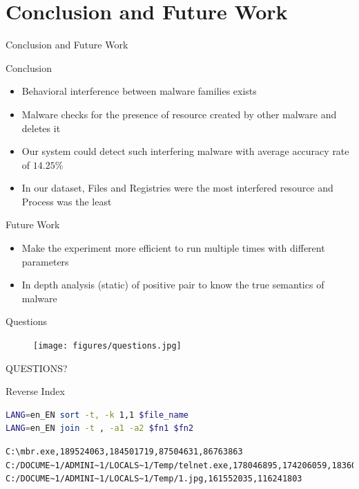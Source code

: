 \documentclass{beamer}
\begin{document}
\section{Conclusion and Future Work}
\begin{frame}{Conclusion and Future Work}
  \begin{block}{Conclusion}
  \begin{itemize}
    \item Behavioral interference between malware families exists
    \item Malware checks for the presence of resource created by other malware and deletes it
    \item Our system could detect such interfering malware with average accuracy rate of $14.25\%$
    \item In our dataset, Files and Registries were the most interfered resource and Process was the least
  \end{itemize}
  \end{block}
  \begin{block}{Future Work}
  \begin{itemize}
    \item Make the experiment more efficient to run multiple times with different parameters
    \item In depth analysis (static) of positive pair to know the true semantics of malware
  \end{itemize}
  \end{block}
\end{frame}
\begin{frame}[plain,c]{Questions}
  \begin{figure}[H]
    \centering
    \texttt{[image: figures/questions.jpg]}
  \end{figure}
  \begin{center}
    \Huge QUESTIONS?\@
  \end{center}
\end{frame}
\appendix
\begin{frame}{Reverse Index}
\begin{lstlisting}[numbers=none,language=bash,caption={Sort and join the reverse index}]
LANG=en_EN sort -t, -k 1,1 $file_name
LANG=en_EN join -t , -a1 -a2 $fn1 $fn2
\end{lstlisting}
\begin{lstlisting}[numbers=none,caption={Sample of reverse index created for File activity},label={lst:reverseindex}]
C:\mbr.exe,189524063,184501719,87504631,86763863
C:/DOCUME~1/ADMINI~1/LOCALS~1/Temp/telnet.exe,178046895,174206059,183601891,89650247
C:/DOCUME~1/ADMINI~1/LOCALS~1/Temp/1.jpg,161552035,116241803
\end{lstlisting}
\end{frame}
\end{document}
